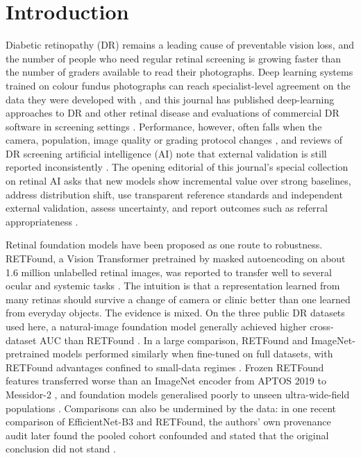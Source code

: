 \documentclass[pdflatex,sn-basic,Numbered]{sn-jnl}
\begin{document}

\maketitle

\section{Introduction}\label{sec:intro}

Diabetic retinopathy (DR) remains a leading cause of preventable vision loss, and the number of people who need regular retinal screening is growing faster than the number of graders available to read their photographs. Deep learning systems trained on colour fundus photographs can reach specialist-level agreement on the data they were developed with \cite{gulshan2016,ting2017}, and this journal has published deep-learning approaches to DR and other retinal disease \cite{nagasawa2019,mahapadi2025,yuan2023} and evaluations of commercial DR software in screening settings \cite{vought2023eyeart}. Performance, however, often falls when the camera, population, image quality or grading protocol changes \cite{beede2020,dai2021spectrum}, and reviews of DR screening artificial intelligence (AI) note that external validation is still reported inconsistently \cite{grzybowski2020review,tripodai2024}. The opening editorial of this journal's special collection on retinal AI asks that new models show incremental value over strong baselines, address distribution shift, use transparent reference standards and independent external validation, assess uncertainty, and report outcomes such as referral appropriateness \cite{jin2026editorial}.

Retinal foundation models have been proposed as one route to robustness. RETFound, a Vision Transformer \cite{dosovitskiy2021vit} pretrained by masked autoencoding \cite{he2022mae} on about 1.6 million unlabelled retinal images, was reported to transfer well to several ocular and systemic tasks \cite{zhou2023retfound}. The intuition is that a representation learned from many retinas should survive a change of camera or clinic better than one learned from everyday objects. The evidence is mixed. On the three public DR datasets used here, a natural-image foundation model generally achieved higher cross-dataset AUC than RETFound \cite{hou2025dinov2}. In a large comparison, RETFound and ImageNet-pretrained models performed similarly when fine-tuned on full datasets, with RETFound advantages confined to small-data regimes \cite{yew2026}. Frozen RETFound features transferred worse than an ImageNet encoder from APTOS 2019 to Messidor-2 \cite{poyrazer2026}, and foundation models generalised poorly to unseen ultra-wide-field populations \cite{li2026uwf}. Comparisons can also be undermined by the data: in one recent comparison of EfficientNet-B3 and RETFound, the authors' own provenance audit later found the pooled cohort confounded and stated that the original conclusion did not stand \cite{alutaibi2026}.
\end{document}
